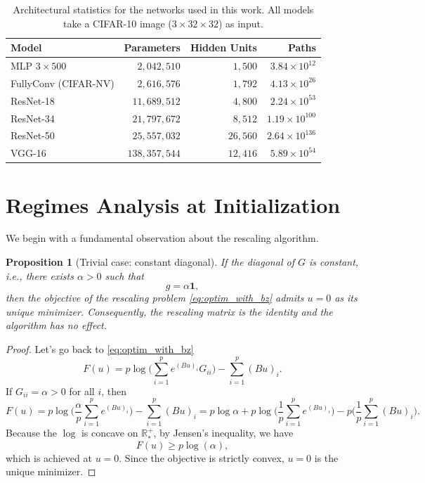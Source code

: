\documentclass{article}
\theoremstyle{plain}
\newtheorem{proposition}[theorem]{Proposition}
\theoremstyle{definition}
\theoremstyle{remark}
\def\R{{\mathbb{R}}}
\begin{document}
\begin{table}[h]
\centering
\begin{tabular}{lrrr}
\toprule
\textbf{Model} & \textbf{Parameters} & \textbf{Hidden Units} & \textbf{Paths} \\
\midrule
MLP $3 \times 500$                                  & $2{,}042{,}510$   & $1{,}500$  & $3.84 \times 10^{12}$  \\
FullyConv (CIFAR-NV) \citep{gitman2017comparison}   & $2{,}616{,}576$   & $1{,}792$  & $4.13 \times 10^{26}$  \\
ResNet-18 \citep{he2016deep}                        & $11{,}689{,}512$  & $4{,}800$  & $2.24 \times 10^{53}$  \\
ResNet-34 \citep{he2016deep}                        & $21{,}797{,}672$  & $8{,}512$  & $1.19 \times 10^{100}$ \\
ResNet-50 \citep{he2016deep}                        & $25{,}557{,}032$  & $26{,}560$ & $2.64 \times 10^{136}$ \\
VGG-16 \citep{simonyan2014very}                     & $138{,}357{,}544$ & $12{,}416$ & $5.89 \times 10^{54}$  \\
\bottomrule
\end{tabular}
\caption{Architectural statistics for the networks used in this work. All models take a CIFAR-10 image ($3 \times 32 \times 32$) as input.} \label{tab:architecture_stats}
\end{table} 



\section{Regimes Analysis at Initialization}
\label{sec:regimes_proofs}


We begin with a fundamental observation about the rescaling algorithm.

\begin{proposition}[Trivial case: constant diagonal]
\label{prop:constant-diagonal}
If the diagonal of $G$ is constant, i.e., there exists $\alpha > 0$ such that
\[
g = \alpha \mathbf{1},
\]
then the objective of the rescaling problem \eqref{eq:optim_with_bz} admits $u = 0$ as its unique minimizer.  
Consequently, the rescaling matrix is the identity and the algorithm has no effect.
\end{proposition}

\begin{proof}
Let's go back to \eqref{eq:optim_with_bz}
\[
F(u) = p\log\Bigg(\sum_{i=1}^{p} e^{(Bu)_i} G_{ii}\Bigg) - \sum_{i=1}^{p} (Bu)_i.
\]
If $G_{ii} = \alpha > 0$ for all $i$, then
\[
F(u) = p \log\Bigg(\frac{\alpha}{p} \sum_{i=1}^{p} e^{(Bu)_i}\Bigg) - \sum_{i=1}^{p} (Bu)_i
 = p \log \alpha + p \log \Bigg(\frac{1}{p} \sum_{i=1}^{p} e^{(Bu)_i}\Bigg) - p \Bigg( \frac{1}{p} \sum_{i=1}^{p} (Bu)_i\Bigg).
\]
Because the $\log$ is concave on $\R_*^{+}$, by Jensen's inequality, we have
\[
F(u) \ge p \log(\alpha),
\]
which is achieved at $u=0$.  
Since the objective is strictly convex, $u=0$ is the unique minimizer.
\end{proof}
\end{document}
